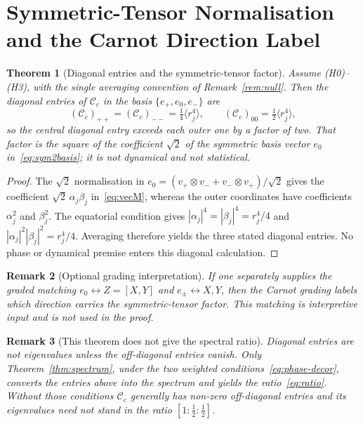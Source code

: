 \documentclass[11pt,a4paper]{article}
\newtheorem{theorem}{Theorem}[section]
\newtheorem{remark}[theorem]{Remark}
\newcommand{\Cc}{\mathcal{C}_c}
\begin{document}
  \section{Symmetric-Tensor Normalisation and the Carnot Direction Label}
  \label{sec:carnot}

  \begin{theorem}[Diagonal entries and the symmetric-tensor factor]
    \label{thm:carnot}
    Assume (H0)--(H3), with the single averaging convention of Remark~\ref{rem:null}.
    Then the diagonal entries of $\Cc$ in the basis $\{e_+, e_0, e_-\}$ are
    \[
      (\Cc)_{++} = (\Cc)_{--} = \tfrac14 \langle r_j^4 \rangle ,
      \qquad
      (\Cc)_{00} = \tfrac12 \langle r_j^4 \rangle ,
    \]
    so the central diagonal entry exceeds each outer one by a factor of two.
    That factor is the square of the coefficient $\sqrt{2}$ of the symmetric basis
    vector $e_0$ in~\eqref{eq:sym2basis}; it is not dynamical and not statistical.

  \end{theorem}

  \begin{proof}
    The $\sqrt{2}$ normalisation in
    $e_0=(v_+\!\otimes v_-+v_-\!\otimes v_+)/\sqrt{2}$ gives the coefficient
    $\sqrt{2}\,\alpha_j\beta_j$ in~\eqref{eq:vecM}, whereas the outer coordinates have
    coefficients $\alpha_j^2$ and $\beta_j^2$.
    The equatorial condition gives
    $|\alpha_j|^4=|\beta_j|^4=r_j^4/4$ and
    $|\alpha_j|^2|\beta_j|^2=r_j^4/4$.
    Averaging therefore yields the three stated diagonal entries.
    No phase or dynamical premise enters this diagonal calculation.
  \end{proof}

  \begin{remark}[Optional grading interpretation]
    If one separately supplies the graded matching $e_0\leftrightarrow Z=[X,Y]$ and
    $e_\pm\leftrightarrow X,Y$, then the Carnot grading labels which direction carries the
    symmetric-tensor factor.
    This matching is interpretive input and is not used in the proof.
  \end{remark}

  \begin{remark}[This theorem does not give the spectral ratio]
    \label{rem:carnot-scope}
    Diagonal entries are not eigenvalues unless the off-diagonal entries vanish.
    Only Theorem~\ref{thm:spectrum}, under the two weighted
    conditions~\eqref{eq:phase-decor}, converts the entries above into the spectrum and yields the
    ratio~\eqref{eq:ratio}.
    Without those conditions $\Cc$ generally has non-zero off-diagonal entries and its eigenvalues
    need not stand in the ratio $[1 : \tfrac12 : \tfrac12]$.
  \end{remark}
\end{document}
